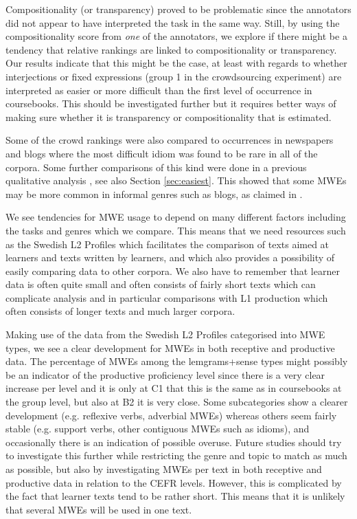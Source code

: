 \documentclass[output=paper,colorlinks,citecolor=brown]{langscibook}
\begin{document}
Compositionality (or transparency)  
proved to be problematic since the annotators did not appear to have interpreted the task in the same way. Still, 
by using the compositionality score from \textit{one} of the annotators, we explore if there might be a tendency that relative rankings are linked to compositionality or transparency.   
Our results indicate that this might be the case, at least with regards to whether interjections or fixed expressions (group 1 in the crowdsourcing experiment) 
are interpreted as easier or more difficult than the first level of occurrence in coursebooks.  
This should be investigated further but it requires better ways of making sure whether it is transparency or compositionality that is estimated.

Some of the crowd rankings were also compared to occurrences in newspapers and blogs where the most difficult idiom was found to be rare in all of the corpora. Some further comparisons of this kind were done in a previous qualitative analysis \citep[][]{lindstrom2022MWE}{}{}, see also Section \ref{sec:easiest}. This showed that some MWEs may be more common in informal genres such as blogs, as claimed in \citet{prentice2013flerordsenheter}.

We see tendencies for MWE usage to depend on many different factors including the tasks and genres which we compare. This means that we need resources such as the Swedish L2 Profiles which facilitates the comparison of texts aimed at learners and texts written by learners, and which also provides a possibility of easily comparing data to other corpora.  
We also have to remember that learner data is often quite small and often consists of fairly short texts \citep[cf.][]{forsberg2010can}{}{} which can complicate analysis and in particular comparisons with L1 production which often consists of longer texts and much larger corpora.

Making use of the data from the Swedish L2 Profiles categorised into MWE types, we see 
a clear development for MWEs in both receptive and productive data. 
The percentage of MWEs among the lemgrams+sense types might possibly be an indicator of the productive proficiency level since there is a very clear increase per level and it is only at C1 that this is the same as in coursebooks at the group level, but also at B2 it is very close. Some subcategories show a clearer development (e.g. reflexive verbs, adverbial MWEs) whereas others seem fairly stable (e.g. support verbs, other contiguous MWEs such as idioms), and occasionally there is an indication of possible overuse.  
Future studies should try to investigate this further while restricting the genre and topic to match as much as possible, but also by investigating MWEs per text in both receptive and productive data in relation to the CEFR levels. However, this is complicated by the fact that learner texts tend to be rather short. This means that it is unlikely that several MWEs will be used in one text.
\end{document}
